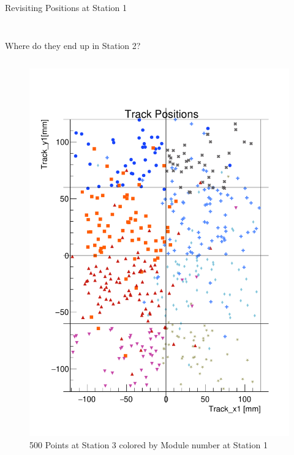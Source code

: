 \begin{frame}{Revisiting Positions at Station 1}
\begin{columns}
\begin{column}{0.2\linewidth}
\begin{figure}
            \end{figure}
        \end{column}
    \end{columns}
\end{frame}

\begin{frame}{Where do they end up in Station 2?}
    \begin{columns}
        \begin{column}{1.2\linewidth}
            \begin{figure}
                \centering
                \includegraphics[height=0.8\textheight]{./ModuleLevelPlots/Positions_st1_module0.pdf}
                \caption{500 Points at Station 3 colored by Module number at Station 1}
            \end{figure}
        \end{column}

\end{columns}
\end{frame}

